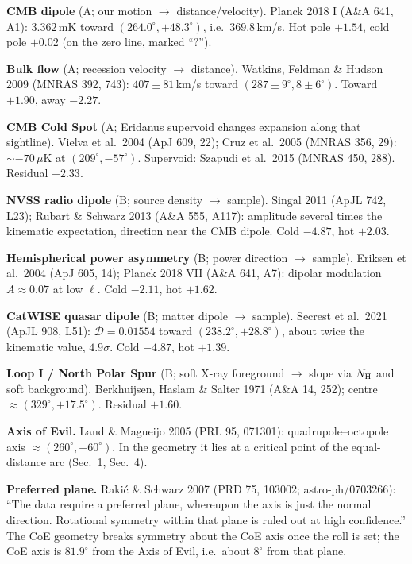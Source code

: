 \documentclass[11pt]{article}
\begin{document}
\textbf{CMB dipole} (A; our motion $\to$ distance/velocity). Planck 2018 I (A\&A 641, A1): $3.362$\,mK toward $(264.0^\circ,+48.3^\circ)$, i.e.\ $369.8$\,km/s. Hot pole $+1.54$, cold pole $+0.02$ (on the zero line, marked ``?'').

\textbf{Bulk flow} (A; recession velocity $\to$ distance). Watkins, Feldman \& Hudson 2009 (MNRAS 392, 743): $407\pm81$\,km/s toward $(287\pm9^\circ, 8\pm6^\circ)$. Toward $+1.90$, away $-2.27$.

\textbf{CMB Cold Spot} (A; Eridanus supervoid changes expansion along that sightline). Vielva et al.\ 2004 (ApJ 609, 22); Cruz et al.\ 2005 (MNRAS 356, 29): $\sim -70\,\mu$K at $(209^\circ,-57^\circ)$. Supervoid: Szapudi et al.\ 2015 (MNRAS 450, 288). Residual $-2.33$.

\textbf{NVSS radio dipole} (B; source density $\to$ sample). Singal 2011 (ApJL 742, L23); Rubart \& Schwarz 2013 (A\&A 555, A117): amplitude several times the kinematic expectation, direction near the CMB dipole. Cold $-4.87$, hot $+2.03$.

\textbf{Hemispherical power asymmetry} (B; power direction $\to$ sample). Eriksen et al.\ 2004 (ApJ 605, 14); Planck 2018 VII (A\&A 641, A7): dipolar modulation $A\approx0.07$ at low $\ell$. Cold $-2.11$, hot $+1.62$.

\textbf{CatWISE quasar dipole} (B; matter dipole $\to$ sample). Secrest et al.\ 2021 (ApJL 908, L51): $\mathcal D=0.01554$ toward $(238.2^\circ,+28.8^\circ)$, about twice the kinematic value, $4.9\sigma$. Cold $-4.87$, hot $+1.39$.

\textbf{Loop I / North Polar Spur} (B; soft X-ray foreground $\to$ slope via $N_{\rm H}$ and soft background). Berkhuijsen, Haslam \& Salter 1971 (A\&A 14, 252); centre $\approx(329^\circ,+17.5^\circ)$. Residual $+1.60$.

\textbf{Axis of Evil.} Land \& Magueijo 2005 (PRL 95, 071301): quadrupole--octopole axis $\approx(260^\circ,+60^\circ)$. In the geometry it lies at a critical point of the equal-distance arc (Sec.~1, Sec.~4).

\textbf{Preferred plane.} Rakić \& Schwarz 2007 (PRD 75, 103002; astro-ph/0703266): ``The data require a preferred plane, whereupon the axis is just the normal direction. Rotational symmetry within that plane is ruled out at high confidence.'' The CoE geometry breaks symmetry about the CoE axis once the roll is set; the CoE axis is $81.9^\circ$ from the Axis of Evil, i.e.\ about $8^\circ$ from that plane.
\end{document}

